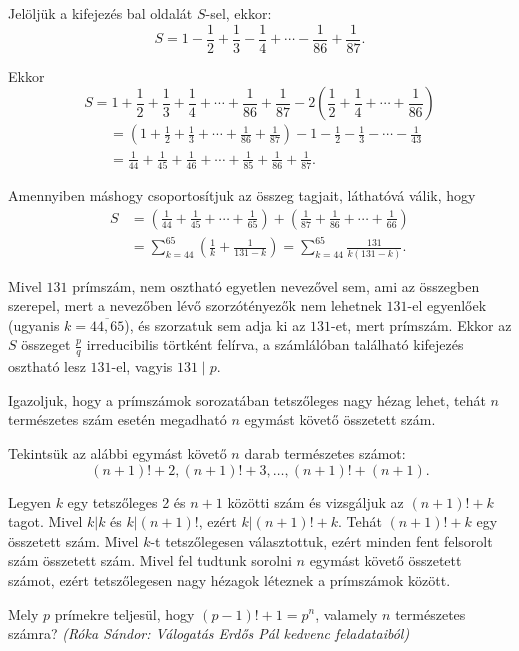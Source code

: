 \begin{solution}
Jelöljük a kifejezés bal oldalát $S$-sel, ekkor: 
\[
S=1-\frac{1}{2}+\frac{1}{3}-\frac{1}{4}+\cdots-\frac{1}{86}+\frac{1}{87}.
\]

Ekkor 
\[
S=1+\frac{1}{2}+\frac{1}{3}+\frac{1}{4}+\cdots+\frac{1}{86}+\frac{1}{87}-2\left(\frac{1}{2}+\frac{1}{4}+\cdots+\frac{1}{86}\right)
\]
\[
\begin{aligned} & =\left(1+\frac{1}{2}+\frac{1}{3}+\cdots+\frac{1}{86}+\frac{1}{87}\right)-1-\frac{1}{2}-\frac{1}{3}-\cdots-\frac{1}{43}\\
 & =\frac{1}{44}+\frac{1}{45}+\frac{1}{46}+\cdots+\frac{1}{85}+\frac{1}{86}+\frac{1}{87}.
\end{aligned}
\]

\vspace{0.2cm}

Amennyiben máshogy csoportosítjuk az összeg tagjait, láthatóvá válik,
hogy 
\[
\begin{aligned}S & =\left(\frac{1}{44}+\frac{1}{45}+\cdots+\frac{1}{65}\right)+\left(\frac{1}{87}+\frac{1}{86}+\cdots+\frac{1}{66}\right)\\
 & =\sum_{k=44}^{65}\left(\frac{1}{k}+\frac{1}{131-k}\right)=\sum_{k=44}^{65}\frac{131}{k(131-k)}.
\end{aligned}
\]

Mivel $131$ prímszám, nem osztható egyetlen nevezővel sem, ami az
összegben szerepel, mert a nevezőben lévő szorzótényezők nem lehetnek
$131$-el egyenlőek (ugyanis $k=\overline{44,65}$), és szorzatuk
sem adja ki az $131$-et, mert prímszám. Ekkor az $S$ összeget $\frac{p}{q}$
irreducibilis törtként felírva, a számlálóban található kifejezés
osztható lesz $131$-el, vagyis $131\mid p$.
\end{solution}
\begin{extraproblem}
Igazoljuk, hogy a prímszámok sorozatában tetszőleges nagy hézag lehet,
tehát $n$ természetes szám esetén megadható $n$ egymást követő összetett
szám. 
\end{extraproblem}

\begin{solution}
Tekintsük az alábbi egymást követő $n$ darab természetes számot:
\[
(n+1)!+2,(n+1)!+3,\dots,(n+1)!+(n+1).
\]

Legyen $k$ egy tetszőleges 2 és $n+1$ közötti szám és vizsgáljuk
az $(n+1)!+k$ tagot. Mivel $k|k$ és $k|(n+1)!$, ezért $k|(n+1)!+k$.
Tehát $(n+1)!+k$ egy összetett szám. Mivel $k$-t tetszőlegesen választottuk,
ezért minden fent felsorolt szám összetett szám. Mivel fel tudtunk
sorolni $n$ egymást követő összetett számot, ezért tetszőlegesen
nagy hézagok léteznek a prímszámok között. 
\end{solution}
\begin{extraproblem}
Mely $p$ prímekre teljesül, hogy $(p-1)!+1=p^{n}$, valamely $n$
természetes számra? \emph{(Róka Sándor: Válogatás Erdős Pál kedvenc
feladataiból)}
\end{extraproblem}

